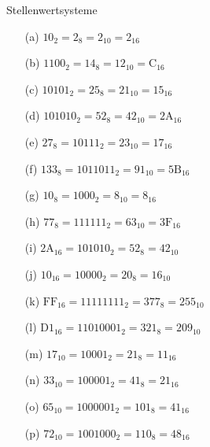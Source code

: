 \begin{exercise}{Stellenwertsysteme}
\begin{solution}
\begin{center}
\begin{minipage}{0.45\textwidth}
\begin{itemize}
\item[(a)] $10_2 = 2_8 = 2_{10} = 2_{16}$
\item[(b)] $1100_2 = 14_8 = 12_{10} = \mathrm{C}_{16}$
\item[(c)] $10101_2 = 25_8 = 21_{10} = 15_{16}$
\item[(d)] $101010_2 = 52_8 = 42_{10} = \mathrm{2A}_{16}$
\item[(e)] $27_8 = 10111_2 = 23_{10} = 17_{16}$
\item[(f)] $133_8 = 1011011_2 = 91_{10} = \mathrm{5B}_{16}$
\item[(g)] $10_8 = 1000_2 = 8_{10} = 8_{16}$
\item[(h)] $77_8 = 111111_2 = 63_{10} = \mathrm{3F}_{16}$
\end{itemize}
\end{minipage}
\begin{minipage}{0.45\textwidth}
\begin{itemize}
\item[(i)] $\mathrm{2A}_{16} = 101010_2 = 52_8 = 42_{10}$  
\item[(j)] $10_{16} = 10000_2 = 20_8 = 16_{10}$           
\item[(k)] $\mathrm{FF}_{16} = 11111111_2 = 377_8 = 255_{10}$ 
\item[(l)] $\mathrm{D1}_{16} = 11010001_2 = 321_8 = 209_{10}$ 
\item[(m)] $17_{10} = 10001_2 = 21_8 = 11_{16}$  
\item[(n)] $33_{10} = 100001_2 = 41_8 = 21_{16}$           
\item[(o)] $65_{10} = 1000001_2 = 101_8 = 41_{16}$ 
\item[(p)] $72_{10} = 1001000_2 = 110_8 = 48_{16}$ 
\end{itemize}
\end{minipage}
\end{center}
\end{solution}

\end{exercise}
